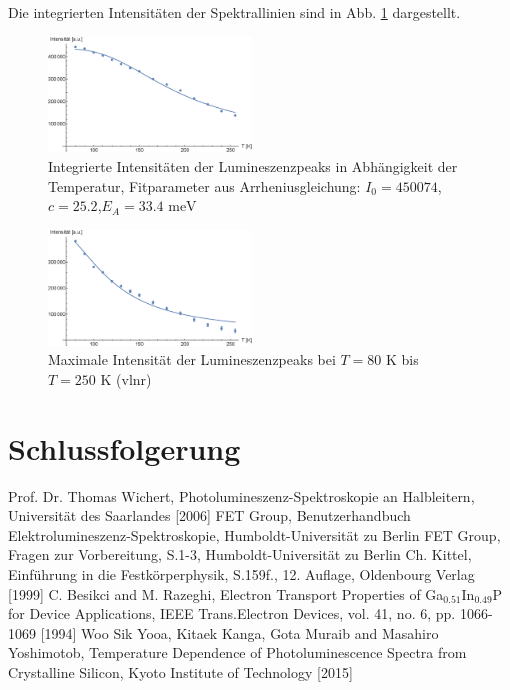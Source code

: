\documentclass[aps,twocolumn,secnumarabic,nobalancelastpage,amsmath,amssymb,
nofootinbib,superscriptaddress]{revtex4-1}
\begin{document}
Die integrierten Intensitäten der Spektrallinien sind in Abb. \ref{fig:intInt} dargestellt.

\begin{figure}[h]
  \centering
  \includegraphics[width=0.48\textwidth]{../Messung/integrintenstempfit.eps}
  \caption{\label{fig:intInt}Integrierte Intensitäten der Lumineszenzpeaks in Abhängigkeit
  der Temperatur,
  Fitparameter aus Arrheniusgleichung: $I_0=450074$,$c=25.2$,$E_A=33.4\text{ meV}$}
\end{figure}

\begin{figure}[h]
  \centering
  \includegraphics[width=0.48\textwidth]{../Messung/maxintenstempfit.eps}
  \caption{\label{fig:maxInt}Maximale Intensität der Lumineszenzpeaks bei $T=80\text{ K}$ bis $T=250\text{ K}$ (vlnr)}
\end{figure}

\section{Schlussfolgerung}




\begin{thebibliography}{99}
Prof. Dr. Thomas Wichert, Photolumineszenz-Spektroskopie an Halbleitern, Universität des Saarlandes [2006]
FET Group, Benutzerhandbuch Elektrolumineszenz-Spektroskopie, Humboldt-Universität zu Berlin
FET Group, Fragen zur Vorbereitung, S.1-3, Humboldt-Universität zu Berlin
Ch. Kittel, Einführung in die Festkörperphysik, S.159f., 12. Auflage, Oldenbourg Verlag [1999]
C. Besikci and M. Razeghi, Electron Transport Properties of Ga$_{0.51}$In$_{0.49}$P for Device Applications, IEEE Trans.Electron Devices, vol. 41, no. 6, pp. 1066-1069 [1994]
Woo Sik Yooa, Kitaek Kanga, Gota Muraib and Masahiro Yoshimotob, Temperature Dependence of Photoluminescence Spectra from Crystalline Silicon, Kyoto Institute of Technology [2015]
\end{thebibliography}
\end{document}
